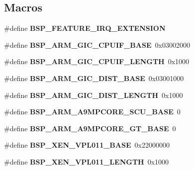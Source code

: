 \subsection*{Macros}
\begin{DoxyCompactItemize}
\item 
\mbox{\label{group__RTEMSBSPsARM_ga5d7d631d3a14b7554160f14eb42f351b}} 
\#define {\bfseries B\+S\+P\+\_\+\+F\+E\+A\+T\+U\+R\+E\+\_\+\+I\+R\+Q\+\_\+\+E\+X\+T\+E\+N\+S\+I\+ON}
\item 
\mbox{\label{group__RTEMSBSPsARM_ga82979270e5d617859b19ad1830434bb6}} 
\#define {\bfseries B\+S\+P\+\_\+\+A\+R\+M\+\_\+\+G\+I\+C\+\_\+\+C\+P\+U\+I\+F\+\_\+\+B\+A\+SE}~0x03002000
\item 
\mbox{\label{group__RTEMSBSPsARM_ga364cd1601680fa46c163e4b8c0e22196}} 
\#define {\bfseries B\+S\+P\+\_\+\+A\+R\+M\+\_\+\+G\+I\+C\+\_\+\+C\+P\+U\+I\+F\+\_\+\+L\+E\+N\+G\+TH}~0x1000
\item 
\mbox{\label{group__RTEMSBSPsARM_ga74b3234f20bb7c846a4b35c68bbb0703}} 
\#define {\bfseries B\+S\+P\+\_\+\+A\+R\+M\+\_\+\+G\+I\+C\+\_\+\+D\+I\+S\+T\+\_\+\+B\+A\+SE}~0x03001000
\item 
\mbox{\label{group__RTEMSBSPsARM_gaee398d86bf27a2e47d4c646387e598f8}} 
\#define {\bfseries B\+S\+P\+\_\+\+A\+R\+M\+\_\+\+G\+I\+C\+\_\+\+D\+I\+S\+T\+\_\+\+L\+E\+N\+G\+TH}~0x1000
\item 
\mbox{\label{group__RTEMSBSPsARM_ga180004170c65ed2eaa91050be70aa480}} 
\#define {\bfseries B\+S\+P\+\_\+\+A\+R\+M\+\_\+\+A9\+M\+P\+C\+O\+R\+E\+\_\+\+S\+C\+U\+\_\+\+B\+A\+SE}~0
\item 
\mbox{\label{group__RTEMSBSPsARM_gafdfd032028e40b1b0e2fcdbcebf24250}} 
\#define {\bfseries B\+S\+P\+\_\+\+A\+R\+M\+\_\+\+A9\+M\+P\+C\+O\+R\+E\+\_\+\+G\+T\+\_\+\+B\+A\+SE}~0
\item 
\mbox{\label{group__RTEMSBSPsARM_gae564a910d71665cd48fa91632f1402d5}} 
\#define {\bfseries B\+S\+P\+\_\+\+X\+E\+N\+\_\+\+V\+P\+L011\+\_\+\+B\+A\+SE}~0x22000000
\item 
\mbox{\label{group__RTEMSBSPsARM_ga8520431e163436a0fe12ce48304931e0}} 
\#define {\bfseries B\+S\+P\+\_\+\+X\+E\+N\+\_\+\+V\+P\+L011\+\_\+\+L\+E\+N\+G\+TH}~0x1000
\end{DoxyCompactItemize}

